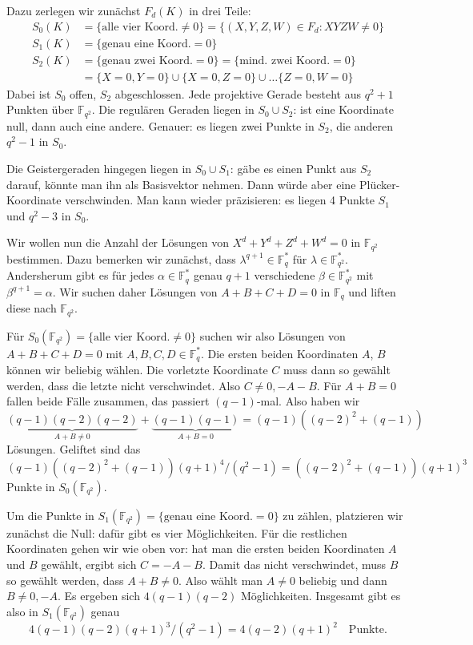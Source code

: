 Dazu zerlegen wir zunächst $F_d(K)$ in drei Teile:
\begin{align*}
S_0(K) &= \{\text{alle vier Koord.}\neq 0\} = \{(X,Y,Z,W) \in F_d : XYZW \neq 0\} \\
S_1(K) &= \{\text{genau eine Koord.}= 0\} \\
S_2(K) &= \{\text{genau zwei Koord.}= 0\} = \{\text{mind. zwei Koord.}= 0\} \\
	&= \{X = 0, Y = 0\} \cup \{X = 0, Z = 0\} \cup \dots \{Z = 0, W = 0\}
\end{align*}
Dabei ist $S_0$ offen, $S_2$ abgeschlossen. Jede projektive Gerade besteht aus $q^2+1$ Punkten über $\mathbb F_{q^2}$. Die regulären Geraden liegen in $S_0 \cup S_2$: ist eine Koordinate null, dann auch eine andere. Genauer: es liegen zwei Punkte in $S_2$, die anderen $q^2-1$ in $S_0$.

Die Geistergeraden hingegen liegen in $S_0 \cup S_1$: gäbe es einen Punkt aus $S_2$ darauf, könnte man ihn als Basisvektor nehmen. Dann würde aber eine Plücker-Koordinate verschwinden. Man kann wieder präzisieren: es liegen 4 Punkte $S_1$ und $q^2-3$ in $S_0$.

Wir wollen nun die Anzahl der Lösungen von $X^d+Y^d+Z^d+W^d=0$ in $\mathbb F_{q^2}$ bestimmen. Dazu bemerken wir zunächst, dass $\lambda^{q+1} \in \mathbb F_q^*$ für $\lambda \in \mathbb F_{q^2}^*$. Andersherum gibt es für jedes $\alpha \in \mathbb F_q^*$ genau $q+1$ verschiedene $\beta \in \mathbb F_{q^2}^*$ mit $\beta^{q+1} = \alpha$. Wir suchen daher Lösungen von $A+B+C+D=0$ in $\mathbb F_q$ und liften diese nach $\mathbb F_{q^2}$.

Für $S_0(\mathbb F_{q^2}) = \{\text{alle vier Koord.}\neq 0\}$ suchen wir also Lösungen von $A+B+C+D=0$ mit $A,B,C,D \in \mathbb F_q^*$. Die ersten beiden Koordinaten $A$, $B$ können wir beliebig wählen. Die vorletzte Koordinate $C$ muss dann so gewählt werden, dass die letzte nicht verschwindet. Also $C \neq 0, -A-B$. Für $A+B=0$ fallen beide Fälle zusammen, das passiert $(q-1)$-mal. Also haben wir
\begin{equation*}
\underbrace{(q-1)(q-2)(q-2)}_{A+B \neq 0} + \underbrace{(q-1)(q-1)}_{A+B=0} = (q-1)((q-2)^2+(q-1))
\end{equation*}
Lösungen. Geliftet sind das
\begin{equation}
(q-1)((q-2)^2+(q-1))(q+1)^4/(q^2-1) = ((q-2)^2+(q-1))(q+1)^3
\end{equation}
Punkte in $S_0(\mathbb F_{q^2})$.

Um die Punkte in $S_1(\mathbb F_{q^2}) = \{\text{genau eine Koord.}= 0\}$ zu zählen, platzieren wir zunächst die Null: dafür gibt es vier Möglichkeiten. Für die restlichen Koordinaten gehen wir wie oben vor: hat man die ersten beiden Koordinaten $A$ und $B$ gewählt, ergibt sich $C=-A-B$. Damit das nicht verschwindet, muss $B$ so gewählt werden, dass $A+B \neq 0$. Also wählt man $A \neq 0$ beliebig und dann $B \neq 0, -A$. Es ergeben sich $4(q-1)(q-2)$ Möglichkeiten. Insgesamt gibt es also in $S_1(\mathbb F_{q^2})$ genau
\begin{equation}
4(q-1)(q-2)(q+1)^3/(q^2-1) = 4(q-2)(q+1)^2 \quad\text{Punkte.}
\end{equation}


